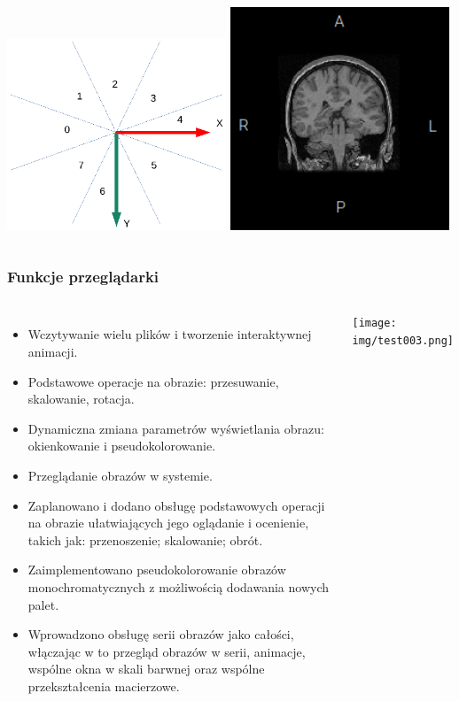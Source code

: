 \documentclass[aspectratio=169]{beamer}
\begin{document}
\begin{frame}[t]
\begin{columns}[t]
        \includegraphics[width=0.49\textwidth]{img/imageorientationindicator-004.pdf}
        \includegraphics[width=0.49\textwidth]{img/imageorientationindicator-005.png}
    \end{columns}
\end{frame}

\begin{frame}[t]
    \frametitle{Funkcje przeglądarki}
    \vspace{-3mm}
    \begin{columns}[T]
        \scriptsize
        \begin{itemize}
            \item Wczytywanie wielu plików i tworzenie interaktywnej animacji.
            \item Podstawowe operacje na obrazie: przesuwanie, skalowanie, rotacja.
            \item Dynamiczna zmiana parametrów wyświetlania obrazu: okienkowanie i pseudokolorowanie.
            \item Przeglądanie obrazów w systemie.
            \item Zaplanowano i dodano obsługę podstawowych operacji na obrazie ułatwiających jego oglądanie i ocenienie, takich jak: przenoszenie; skalowanie; obrót.
            \item Zaimplementowano pseudokolorowanie obrazów monochromatycznych z możliwością dodawania nowych palet.
            \item Wprowadzono obsługę serii obrazów jako całości, włączając w to przegląd obrazów w serii, animacje, wspólne okna w skali barwnej oraz wspólne przekształcenia macierzowe.
        \end{itemize}

        \texttt{[image: img/test003.png]}
    \end{columns}
\end{frame}
\end{document}
